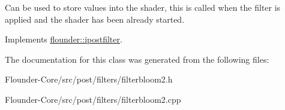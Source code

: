 Can be used to store values into the shader, this is called when the filter is applied and the shader has been already started. 



Implements \hyperlink{classflounder_1_1ipostfilter_a9b658b4672718d5ac36539875bde722e}{flounder\+::ipostfilter}.



The documentation for this class was generated from the following files\+:\begin{DoxyCompactItemize}
\item 
Flounder-\/\+Core/src/post/filters/filterbloom2.\+h\item 
Flounder-\/\+Core/src/post/filters/filterbloom2.\+cpp\end{DoxyCompactItemize}
